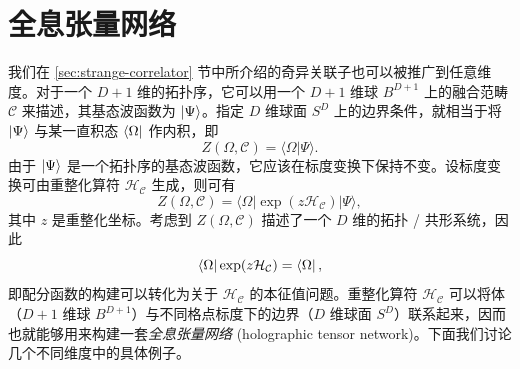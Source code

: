 \section{全息张量网络}
\label{sec:holographic-tensor-network}


我们在 \ref{sec:strange-correlator} 节中所介绍的奇异关联子也可以被推广到任意维度。对于一个 $D+1$ 维的拓扑序，它可以用一个 $D+1$ 维球 $B^{D+1}$ 上的融合范畴 $\mathcal{C}$ 来描述，其基态波函数为 $\ket{\Psi}$。指定 $D$ 维球面 $S^D$ 上的边界条件，就相当于将 $\ket{\Psi}$ 与某一直积态 $\bra{\Omega}$ 作内积，即
\begin{equation}
  Z(\Omega, \mathcal{C}) = \langle \Omega|\Psi \rangle.
\end{equation}
由于 $\ket{\Psi}$ 是一个拓扑序的基态波函数，它应该在标度变换下保持不变。设标度变换可由重整化算符 $\mathcal{H}_{\mathcal{C}}$ 生成，则可有
\begin{equation}
  Z(\Omega, \mathcal{C}) = \langle \Omega | \exp(z\mathcal{H}_{\mathcal{C}}) | \Psi \rangle,
\end{equation}
其中 $z$ 是重整化坐标。考虑到 $Z(\Omega, \mathcal{C})$ 描述了一个 $D$ 维的拓扑 / 共形系统，因此
\begin{equation}
  \bra{\Omega} \exp(z\mathcal{H}_{\mathcal{C}}) = \bra{\Omega},
  \label{eq:rg-operator}
\end{equation}
即配分函数的构建可以转化为关于 $\mathcal{H}_{\mathcal{C}}$ 的本征值问题。重整化算符 $\mathcal{H}_{\mathcal{C}}$ 可以将体（$D+1$ 维球 $B^{D+1}$）与不同格点标度下的边界（$D$ 维球面 $S^D$）联系起来，因而也就能够用来构建一套\emph{全息张量网络} (holographic tensor network)。下面我们讨论几个不同维度中的具体例子。

